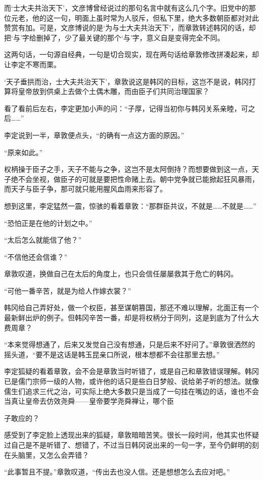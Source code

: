 而‘士大夫共治天下’，文彦博曾经说过的那句名言中就有这么几个字。旧党中的那位元老，他的这一句，明面上虽时常为人驳斥，但私下里，绝大多数朝臣都对对此赞赏有加。可是，文彦博说的是‘为与士大夫共治天下’，而章敦转述韩冈的话，却把‘与’字给删掉了，少了最关键的那个‘与’字，意义自是变得完全不同。

这两句话，一句源自经典，一句是切合现实，现在两句话给章敦修改拼凑起来，却让李定不寒而栗。

‘天子垂拱而治，士大夫共治天下’，章敦说这是韩冈的目标，这岂不是说，韩冈打算将皇帝放到供桌上去做个土偶木雕，而由臣子们共同治理国家？

看了看前后左右，李定更加小声的问：“子厚，记得当初你与韩冈关系亲睦，可之后……”

李定说到一半，章敦便点头，“的确有一点这方面的原因。”

“原来如此。”

权柄操于臣子之手，天子不能与之争，这岂不是太阿倒持？而想要做到这一点，天子绝不会坐视，做臣子的可就是要把性命赌上去。朝中党争就已能掀起狂风暴雨，而天子与臣子争，那可就只能用腥风血雨来形容了。

想到这里，李定猛然一震，惊骇的看着章敦：“那群臣共议，不就是……不就是……”

“恐怕正是在他的计划之中。”

“太后怎么就能信了他？”

“不信他还会信谁？”

章敦叹道，换做自己在太后的角度上，也只会信任屡屡救其于危亡的韩冈。

“可他一番辛苦，就是为给人作嫁衣裳？”

韩冈给自己弄好处，做一个权臣，甚至谋朝篡国，那还不难以理解，北面正有一个最新鲜出炉的例子。但韩冈辛苦一番，却是将权柄分于同列，这是到底为了什么大费周章？

“本来觉得想通了，后来又发觉自己没有想通，只是后来不好问了。”章敦很洒然的摇头道，“要不是这话是韩玉昆亲口所说，根本想都不会往那里去想。”

李定狐疑的看着章敦，会不会是章敦当时听错了，或是自己和章敦错误理解。韩冈已是儒门宗师一级的人物，或许他的话只是些白日梦般、说给弟子听的想法。就像儒生们追求三代之治，可实际上绝大多数只是当成了一句挂在嘴边的话，谁也不会当真让皇帝去仿效尧舜——皇帝要学尧舜禅让，哪个臣

子敢应的？

感受到了李定脸上透现出来的狐疑，章敦暗暗苦笑。很长一段时间，他其实也怀疑过自己是不是听错了、想错了，不过当日韩冈说出来的一句一字，至今仍鲜明的刻在头脑里，又怎么会弄错？

“此事暂且不提。”章敦叹道，“传出去也没人信。还是想想怎么去应对吧。”

